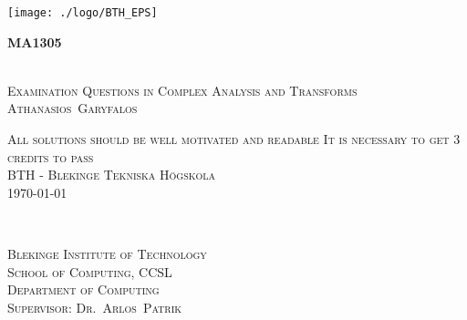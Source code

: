 \thispagestyle{empty}

\begin{titlepage}
\begin{center}

\begin{minipage}[c]{0.9\textwidth}
\begin{flushright} 
\texttt{[image: ./logo/BTH\_EPS]}
\end{flushright}
\end{minipage}
\begin{minipage}[c]{0.9\textwidth}
\vspace{-1.5cm}
\begin{flushleft} \large
\textbf{MA1305}
\end{flushleft}
\end{minipage}
\HRule \\[2.0cm]


\textsc{\LARGE Examination Questions in Complex Analysis and Transforms}\\[0.5cm]

\textsc{\LARGE Athanasios~Garyfalos \\[2.0cm] }

\textsc{\Large All solutions should be well motivated and readable
It is necessary to get 3 credits to pass}\\[1.5cm]

\textsc{\Large BTH - Blekinge Tekniska Högskola \\[1.5cm] {\large \today}}

\vfill
\HRule \\[2.0cm]

\begin{minipage}[c]{\textwidth}
\vspace{-2cm}
\begin{flushleft} \large
{\footnotesize \textsc{Blekinge Institute of Technology}}\\
{\footnotesize \textsc{School of Computing, CCSL}}\\
{\footnotesize \textsc{Department of Computing}}\\
{\footnotesize \textsc{Supervisor: Dr.~Arlos~Patrik}}\\
\end{flushleft}
\end{minipage}


\end{center}
\end{titlepage}
